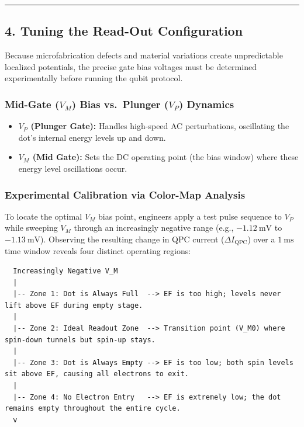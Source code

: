 \documentclass[
]{article}
\providecommand{\tightlist}{%
  \setlength{\itemsep}{0pt}\setlength{\parskip}{0pt}}
\begin{document}
\begin{center}\rule{0.5\linewidth}{0.5pt}\end{center}

\subsection{4. Tuning the Read-Out
Configuration}\label{tuning-the-read-out-configuration}

Because microfabrication defects and material variations create
unpredictable localized potentials, the precise gate bias voltages must
be determined experimentally before running the qubit protocol.

\subsubsection{\texorpdfstring{Mid-Gate (\(V_M\)) Bias vs.~Plunger
(\(V_P\))
Dynamics}{Mid-Gate (V\_M) Bias vs.~Plunger (V\_P) Dynamics}}\label{mid-gate-v_m-bias-vs.-plunger-v_p-dynamics}

\begin{itemize}
\tightlist
\item
  \textbf{\(V_P\) (Plunger Gate):} Handles high-speed AC perturbations,
  oscillating the dot's internal energy levels up and down.
\item
  \textbf{\(V_M\) (Mid Gate):} Sets the DC operating point (the bias
  window) where these energy level oscillations occur.
\end{itemize}

\subsubsection{Experimental Calibration via Color-Map
Analysis}\label{experimental-calibration-via-color-map-analysis}

To locate the optimal \(V_M\) bias point, engineers apply a test pulse
sequence to \(V_P\) while sweeping \(V_M\) through an increasingly
negative range (e.g., \(-1.12\ \text{mV}\) to \(-1.13\ \text{mV}\)).
Observing the resulting change in QPC current
(\(\Delta I_{\text{QPC}}\)) over a \(1\ \text{ms}\) time window reveals
four distinct operating regions:

\begin{verbatim}
  Increasingly Negative V_M
  | 
  |-- Zone 1: Dot is Always Full  --> EF is too high; levels never lift above EF during empty stage.
  |
  |-- Zone 2: Ideal Readout Zone  --> Transition point (V_M0) where spin-down tunnels but spin-up stays.
  |
  |-- Zone 3: Dot is Always Empty --> EF is too low; both spin levels sit above EF, causing all electrons to exit.
  |
  |-- Zone 4: No Electron Entry   --> EF is extremely low; the dot remains empty throughout the entire cycle.
  v
\end{verbatim}
\end{document}
